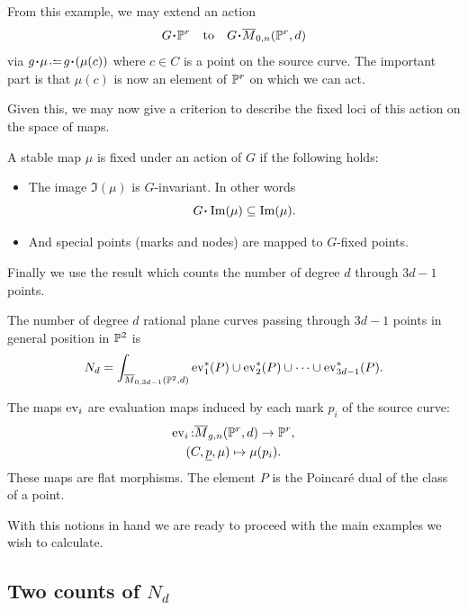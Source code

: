 \documentclass[12pt]{memoir}
\begin{document}
From this example, we may extend an action 
$$G\.\bP^r\word{to}G\.\ov M_{0,n}(\bP^r,d)$$
via $g\.\mu\defeq g\.(\mu(c))$ where $c\in C$ is a point on the source curve. The important part is that $\mu(c)$ is now an element of $\mathbb{P}^r$ on which we can act.\par
Given this, we may now give a criterion to describe the fixed loci of this action on the space of maps.

\begin{Prop}\label{prop:who-fixed-maps}
    A stable map $\mu$ is fixed under an action of $G$ if the following holds:
    \begin{itemize}
        \item The image $\Im(\mu)$ is $G$-invariant. In other words 
        $$G\.\Im(\mu)\subseteq\Im(\mu).$$
        \item And special points (marks and nodes) are mapped to $G$-fixed points.
    \end{itemize}
\end{Prop}

Finally we use the result which counts the number of degree $d$ through $3d-1$ points.

\begin{Prop}
    The number of degree $d$ rational plane curves passing through $3d-1$ points in general position in $\mathbb{P}^2$ is 
    $$N_d=\int_{\overline{M}_{0,3d-1}(\mathbb{P}^2,d)}\operatorname{ev}_1^\ast(P)\cup\operatorname{ev}_2^\ast(P)\cup\cdots\cup\operatorname{ev}_{3d-1}^\ast(P).$$
\end{Prop}

The maps $\operatorname{ev}_i$ are evaluation maps induced by each mark $p_i$ of the source curve:
\begin{gather*}
    \operatorname{ev}_i\mathbin{:} \overline{M}_{g,n}(\mathbb{P}^r,d)\to\mathbb{P}^r,\\
    (C,\underline p,\mu)\mapsto \mu(p_i).
\end{gather*}
These maps are flat morphisms. The element $P$ is the Poincaré dual of the class of a point.\par
With this notions in hand we are ready to proceed with the main examples we wish to calculate.

\subsection{Two counts of $N_d$}
\end{document}
